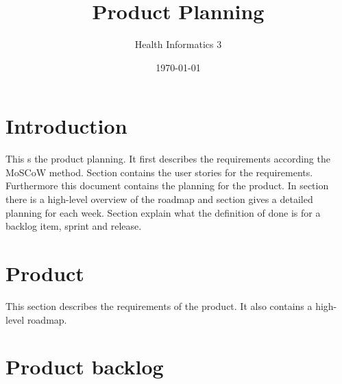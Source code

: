 \documentclass[a4paper]{article}
\title{Product Planning}
\author{Health Informatics 3}
\date{\today}
\begin{document}
\maketitle

\section{Introduction}
This s the product planning. It first describes the requirements according the MoSCoW method. Section  contains the user stories for the requirements. Furthermore this document contains the planning for the product. In section  there is a high-level overview of the roadmap and section  gives a detailed planning for each week. Section  explain what the definition of done is for a backlog item, sprint and release. 
\section{Product}
This section describes the requirements of the product. It also contains a high-level roadmap.


\section{Product backlog}



\end{document}
